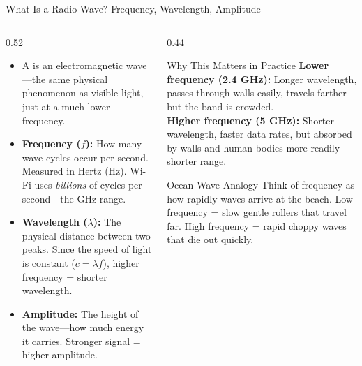 \documentclass[aspectratio=169]{beamer}
\begin{document}
\begin{frame}{What Is a Radio Wave? Frequency, Wavelength, Amplitude}
    \begin{columns}[T]
        \begin{column}{0.52\textwidth}
            \footnotesize
            \begin{itemize}
                \item A  is an electromagnetic wave---the same physical phenomenon as visible light, just at a much lower frequency.
                \item \textbf{Frequency ($f$):} How many wave cycles occur per second. Measured in Hertz (Hz). Wi-Fi uses \emph{billions} of cycles per second---the GHz range.
                \item \textbf{Wavelength ($\lambda$):} The physical distance between two peaks. Since the speed of light is constant ($c = \lambda f$), higher frequency = shorter wavelength.
                \item \textbf{Amplitude:} The height of the wave---how much energy it carries. Stronger signal = higher amplitude.
            \end{itemize}
        \end{column}
        \begin{column}{0.44\textwidth}
            \begin{alertblock}{Why This Matters in Practice}
                \footnotesize
                \textbf{Lower frequency (2.4 GHz):} Longer wavelength, passes through walls easily, travels farther---but the band is crowded.\\[0.3em]
                \textbf{Higher frequency (5 GHz):} Shorter wavelength, faster data rates, but absorbed by walls and human bodies more readily---shorter range.
            \end{alertblock}
            \vspace{0.3em}
            \begin{exampleblock}{Ocean Wave Analogy}
                \footnotesize
                Think of frequency as how rapidly waves arrive at the beach. Low frequency = slow gentle rollers that travel far. High frequency = rapid choppy waves that die out quickly.
            \end{exampleblock}
        \end{column}
    \end{columns}
\end{frame}
\end{document}
